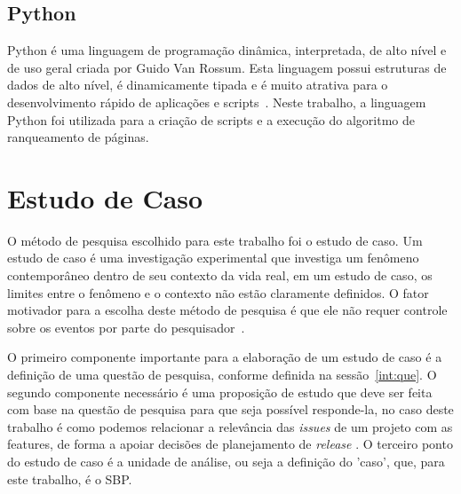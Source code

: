 \subsection{Python}
\label{met:tec:python}
Python é uma linguagem de programação dinâmica, interpretada, de alto nível e de  uso geral criada por Guido Van Rossum. Esta linguagem possui estruturas de dados de alto nível, é dinamicamente tipada e é muito atrativa para o desenvolvimento rápido de aplicações e scripts~\cite{python}. Neste trabalho, a linguagem Python foi utilizada para a criação de scripts e a execução do algoritmo de ranqueamento de páginas.


\section{Estudo de Caso}
\label{met:est}
O método de pesquisa escolhido para este trabalho foi o estudo de caso. Um estudo de caso é uma investigação experimental que investiga um fenômeno contemporâneo dentro de seu contexto da vida real, em um estudo de caso, os limites entre o fenômeno e o contexto não estão claramente definidos. O fator motivador para a escolha deste método de pesquisa é que ele não requer controle sobre os eventos por parte do pesquisador~\cite{yin}.

O primeiro componente importante para a elaboração de um estudo de caso é a definição de uma questão de pesquisa, conforme definida na sessão~\ref{int:que}. O segundo componente necessário é uma proposição de estudo que deve ser feita com base na questão de pesquisa para que seja possível responde-la, no caso deste trabalho é como podemos relacionar a relevância das \textit{issues} de um projeto com as features, de forma a apoiar decisões de planejamento de \textit{release} . O terceiro ponto do estudo de caso é a unidade de análise, ou seja a definição do 'caso', que, para este trabalho, é o SBP.

